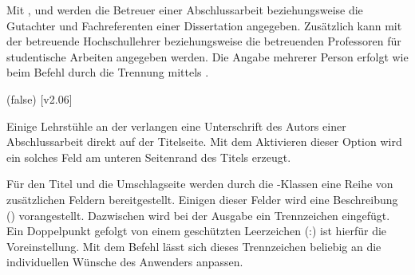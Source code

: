 \begin{DeclareEntity*}{}
\begin{DeclareEntity*}{}
\begin{DeclareEntity*}{}
\begin{Declaration}
\begin{Declaration}
\begin{Declaration}
\begin{Declaration}
Mit ,  und  werden die Betreuer 
einer Abschlussarbeit beziehungsweise die Gutachter und Fachreferenten einer 
Dissertation angegeben. Zusätzlich kann mit  der betreuende 
Hochschullehrer beziehungsweise die betreuenden Professoren für studentische 
Arbeiten angegeben werden. Die Angabe mehrerer Person erfolgt wie beim Befehl 
 durch die Trennung mittels .
\end{Declaration}
\end{Declaration}
\end{Declaration}
\end{Declaration}

\begin{Declaration}
  {}
  (false)
  [v2.06]
\printdeclarationlist

Einige Lehrstühle an der \TnUD verlangen eine Unterschrift des Autors einer 
Abschlussarbeit direkt auf der Titelseite. Mit dem Aktivieren dieser Option 
wird ein solches Feld am unteren Seitenrand des Titels erzeugt.
\end{Declaration}

\begin{Declaration}
  {}

Für den Titel und die Umschlagseite werden durch die \TUDScript-Klassen eine 
Reihe von zusätzlichen Feldern bereitgestellt. Einigen dieser Felder wird eine 
Beschreibung () vorangestellt. Dazwischen 
wird bei der Ausgabe ein Trennzeichen eingefügt. Ein Doppelpunkt gefolgt von 
einem geschützten Leerzeichen (:) ist hierfür die 
Voreinstellung. Mit dem Befehl  lässt sich dieses 
Trennzeichen beliebig an die individuellen Wünsche des Anwenders anpassen.
\end{Declaration}
%



\end{DeclareEntity*}
\end{DeclareEntity*}
\end{DeclareEntity*}
